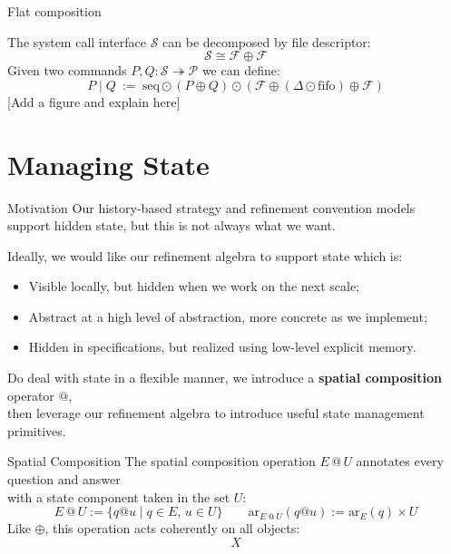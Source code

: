 \documentclass[aspectratio=1610,mathserif]{beamer}
\newcommand{\kw}[1]{\ensuremath{ \mathrm{#1} }}
\begin{document}
\begin{frame}[fragile]{Flat composition}
  \begin{example}
    The system call interface $\mathcal{S}$
    can be decomposed by file descriptor:
    \[
      \mathcal{S} \cong \mathcal{F} \oplus \mathcal{F}
    \]
    Given two commands $P, Q : \mathcal{S} \twoheadrightarrow \mathcal{P}$
    we can define:
\[
  P \mathbin| Q \: := \:
    \kw{seq} \odot (P \oplus Q)
         \odot (\mathcal{F} \oplus (\Delta \odot \kw{fifo}) \oplus \mathcal{F})
\]
  [Add a figure and explain here]
  \end{example}
\end{frame}

\section{Managing State}

\begin{frame}{Motivation}
Our history-based strategy and refinement convention models \\
support hidden state, but this is not always what we want.

\vfill \pause
Ideally, we would like our refinement algebra to support state which is:
\begin{itemize}
  \item Visible locally, but hidden when we work on the next scale;
  \item Abstract at a high level of abstraction, more concrete as we implement;
  \item Hidden in specifications, but realized using low-level explicit memory.
\end{itemize}

\vfill \pause
Do deal with state in a flexible manner,
we introduce a \textbf{spatial composition} operator $\mathbin@$, \\
then leverage our refinement algebra to introduce
useful state management primitives.
\end{frame}

\begin{frame}{Spatial Composition}
The spatial composition operation $E \mathbin@ U$ annotates
every question and answer \\ with a state component taken in the set $U$:
\[
  E \mathbin@ U := \{ q @ u \mid q \in E, \, u \in U \}
  \qquad
  \kw{ar}_{E \mathbin@ U}(q @ u) := \kw{ar}_E(q) \times U
\]
Like $\oplus$, this operation acts coherently on all objects:
\[
  X
\]
\end{frame}
\end{document}
